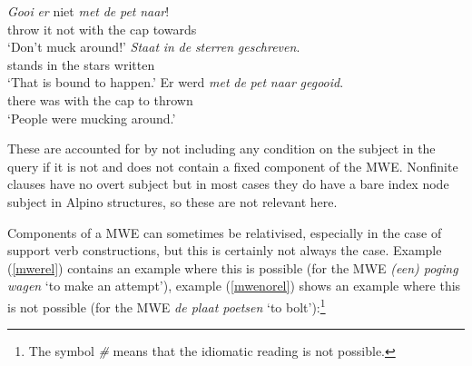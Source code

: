 \documentclass[output=paper,colorlinks,citecolor=brown]{langscibook}
\begin{document}
\begin{exe}
\ex
\begin{xlist}
\ex \gll \textit{Gooi} \textit{er} niet \textit{met} \textit{de} \textit{pet} \textit{naar}!\\
throw it not with the cap towards\\ \label{imperative}
\glt `Don't muck around!'
\ex \gll \textit{Staat} \textit{in} \textit{de} \textit{sterren} \textit{geschreven}.\\
stands in the stars written\\
\glt `That is bound to happen.'  \label{topicdrop}
\ex\label{impersonalpassivenosubject} \gll Er werd \textit{met} \textit{de} \textit{pet} \textit{naar} \textit{gegooid}.\\
there was with the cap to thrown\\
\glt `People were mucking around.'
\end{xlist}
\end{exe}
These are accounted for by not including any condition on the subject in the query if it is not  and does not contain a fixed component of the MWE. Nonfinite clauses have no overt subject but in most cases they do have a bare index node subject in Alpino structures, so these are not relevant here.

Components of a MWE can sometimes be relativised, especially in the case of support verb constructions, but this is certainly not always the case. Example (\ref{mwerel}) contains an example where this is possible (for the MWE \textit{(een) poging wagen} `to make an attempt'), example (\ref{mwenorel}) shows an example where this is not possible (for the MWE \textit{de plaat poetsen} `to bolt'):\footnote{The symbol \textit{\#} means that the idiomatic reading is not possible.}

\begin{exe}
\ex\judgewidth{\#}
\begin{xlist}
\end{xlist}
\end{exe}
\end{document}

